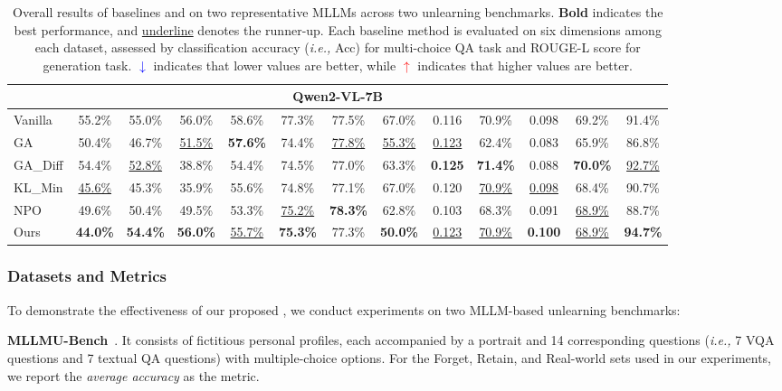 \begin{table*}[t!]
{\begin{tabular}{l|cccccc|cccccc}
\multicolumn{13}{c}{\textbf{Qwen2-VL-7B}} \\
\midrule
Vanilla&55.2\%&55.0\%&56.0\%&58.6\%&77.3\%&77.5\%&67.0\%&0.116&70.9\%&0.098&69.2\%&91.4\%\\
\hdashline
GA&50.4\%&46.7\%&\underline{51.5\%}&\textbf{57.6\%}&74.4\%&\underline{77.8\%}&\underline{55.3\%}&\underline{0.123}&62.4\%&0.083&65.9\%&86.8\%\\
GA\_Diff&54.4\%&\underline{52.8\%}&38.8\%&54.4\%&74.5\%&77.0\%&63.3\%&\textbf{0.125}&\textbf{71.4\%}&0.088&\textbf{70.0\%}&\underline{92.7\%}\\
KL\_Min&\underline{45.6\%}&45.3\%&35.9\%&55.6\%&74.8\%&77.1\%&67.0\%&0.120&\underline{70.9\%}&\underline{0.098}&68.4\%&90.7\%\\
NPO&49.6\%&50.4\%&49.5\%&53.3\%&\underline{75.2\%}&\textbf{78.3\%}&62.8\%&0.103&68.3\%&0.091&\underline{68.9\%}&88.7\%\\
\rowcolor{black!20}Ours&\textbf{44.0\%}&\textbf{54.4\%}&\textbf{56.0\%}&\underline{55.7\%}&\textbf{75.3\%}&77.3\%&\textbf{50.0\%}&\underline{0.123}&\underline{70.9\%}&\textbf{0.100}&\underline{68.9\%}&\textbf{94.7\%}\\
\bottomrule
\end{tabular}}
    \vspace{-0.1in}
    \caption{Overall results of baselines and \method on two representative MLLMs across two unlearning benchmarks. \textbf{Bold} indicates the best performance, and \underline{underline} denotes the runner-up. Each baseline method is evaluated on six dimensions among each dataset, assessed by classification accuracy (\textit{i.e.,} Acc) for multi-choice QA task and ROUGE-L score for generation task. \textcolor{blue}{$\downarrow$} indicates that lower values are better, while \textcolor{red}{$\uparrow$} indicates that higher values are better.}
    \label{tab:main-table}
\end{table*}

\subsubsection{Datasets and Metrics}
To demonstrate the effectiveness of our proposed \method, we conduct experiments on two MLLM-based unlearning benchmarks:

\textbf{MLLMU-Bench}~\cite{liu2024mllmubench}. It consists of fictitious personal profiles, each accompanied by a portrait and 14 corresponding questions (\textit{i.e.,} 7 VQA questions and 7 textual QA questions) with multiple-choice options. For the Forget, Retain, and Real-world sets used in our experiments, we report the \textit{average accuracy} as the metric.


